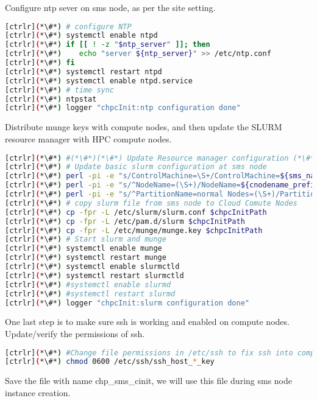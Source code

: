 	Configure ntp sever on sms node, as per the site setting.


\begin{lstlisting}[language=bash,keywords={}]
[ctrlr](*\#*) # configure NTP
[ctrlr](*\#*) systemctl enable ntpd
[ctrlr](*\#*) if [[ ! -z "$ntp_server" ]]; then
[ctrlr](*\#*)    echo "server ${ntp_server}" >> /etc/ntp.conf
[ctrlr](*\#*) fi
[ctrlr](*\#*) systemctl restart ntpd
[ctrlr](*\#*) systemctl enable ntpd.service
[ctrlr](*\#*) # time sync
[ctrlr](*\#*) ntpstat
[ctrlr](*\#*) logger "chpcInit:ntp configuration done"
\end{lstlisting} 

	Distribute munge keys with compute nodes, and then update the SLURM resource manager with HPC compute nodes.



\begin{lstlisting}[language=bash,keywords={}]
[ctrlr](*\#*) #(*\#*)(*\#*) Update Resource manager configuration (*\#*)(*\#*)(*\#*)
[ctrlr](*\#*) # Update basic slurm configuration at sms node
[ctrlr](*\#*) perl -pi -e "s/ControlMachine=\S+/ControlMachine=${sms_name}/" /etc/slurm/slurm.conf
[ctrlr](*\#*) perl -pi -e "s/^NodeName=(\S+)/NodeName=${cnodename_prefix}[1-${num_ccomputes}]/" /etc/slurm/slurm.conf
[ctrlr](*\#*) perl -pi -e "s/^PartitionName=normal Nodes=(\S+)/PartitionName=normal Nodes=${cnodename_prefix}[1-${num_ccomputes}]/" /etc/slurm/slurm.conf
[ctrlr](*\#*) # copy slurm file from sms node to Cloud Comute Nodes
[ctrlr](*\#*) cp -fpr -L /etc/slurm/slurm.conf $chpcInitPath
[ctrlr](*\#*) cp -fpr -L /etc/pam.d/slurm $chpcInitPath
[ctrlr](*\#*) cp -fpr -L /etc/munge/munge.key $chpcInitPath
[ctrlr](*\#*) # Start slurm and munge 
[ctrlr](*\#*) systemctl enable munge
[ctrlr](*\#*) systemctl restart munge
[ctrlr](*\#*) systemctl enable slurmctld
[ctrlr](*\#*) systemctl restart slurmctld
[ctrlr](*\#*) #systemctl enable slurmd
[ctrlr](*\#*) #systemctl restart slurmd
[ctrlr](*\#*) logger "chpcInit:slurm configuration done"
\end{lstlisting} 


	One last step is to make sure ssh is working and enabled on compute nodes. Update/verify the permissions of ssh.


\begin{lstlisting}[language=bash,keywords={}]
[ctrlr](*\#*) #Change file permissions in /etc/ssh to fix ssh into compute node
[ctrlr](*\#*) chmod 0600 /etc/ssh/ssh_host_*_key
\end{lstlisting} 

	Save the file with name chp\_sms\_cinit, we will use this file during sms node instance creation.

